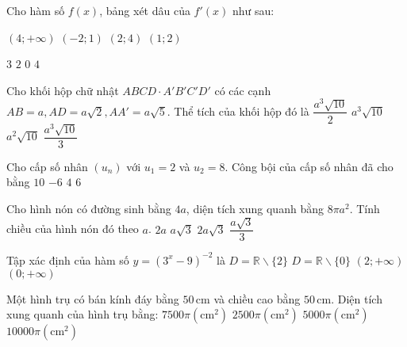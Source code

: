 \begin{ex}%
Cho hàm số $f(x)$, bảng xét dâu của $f'(x)$ như sau:
{
}
\choice
{$(4;+\infty)$}
{\True $(-2; 1)$}
{$(2; 4)$}
{$(1; 2)$}
\end{ex}
\begin{ex}%
{
}
\choice
{$3$}
{$2$}
{$0$}
{\True $4$}
\end{ex}
\begin{ex}%
Cho khối hộp chữ nhật $ABCD \cdot A'B'C'D'$ có các cạnh $AB=a, AD=a \sqrt{2}, AA'=a \sqrt{5}$. Thể tích của khối hộp đó là
\choice
{$\dfrac{a^3 \sqrt{10}}{2}$}
{\True $a^3 \sqrt{10}$}
{$a^2 \sqrt{10}$}
{$\dfrac{a^3 \sqrt{10}}{3}$}
\end{ex}
\begin{ex}%
Cho cấp số nhân $\left(u_n\right)$ với $u_1=2$ và $u_2=8$. Công bội của cấp số nhân đã cho bằng
\choice
{$10$}
{$-6$}
{\True $4$}
{$6$}
\end{ex}
\begin{ex}%
Cho hình nón có đường sinh bằng $4 a$, diện tích xung quanh bằng $8\pi a^2$. Tính chiều của hình nón đó theo $a$.
\choice
{$2 a$}
{$a \sqrt{3}$}
{\True $2 a \sqrt{3}$}
{$\dfrac{a \sqrt{3}}{3}$}
\end{ex}
\begin{ex}%
Tập xác định của hàm số $y=\left(3^{x}-9\right)^{-2}$ là
\choice
{\True $D=\mathbb{R} \backslash\{2\}$}
{$D=\mathbb{R} \backslash\{0\}$}
{$(2;+\infty)$}
{$(0;+\infty)$}
\end{ex}
\begin{ex}%
Một hình trụ có bán kính đáy bằng $50\mathrm{\,cm}$ và chiều cao bằng $50\mathrm{\,cm}$. Diện tích xung quanh của hình trụ bằng:
\choice
{$7500\pi\left(\mathrm{cm}^2\right)$}
{$2500\pi\left(\mathrm{cm}^2\right)$}
{\True $5000\pi\left(\mathrm{cm}^2\right)$}
{$10000\pi\left(\mathrm{cm}^2\right)$}
\end{ex}
